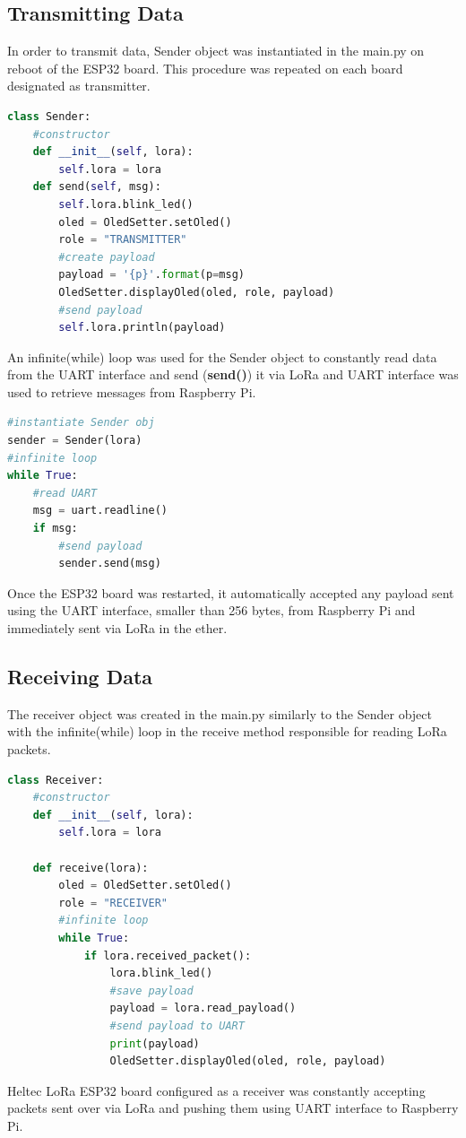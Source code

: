 \documentclass[oneside,12pt]{book}
\begin{document}
\subsection{Transmitting Data}
In order to transmit data, Sender object was instantiated in the main.py on reboot of the ESP32 board. This procedure was repeated on each board designated as transmitter.
\begin{lstlisting}[language=Python, caption=Class Sender - MicroPython,captionpos=b]
class Sender:
    #constructor
    def __init__(self, lora):
        self.lora = lora
    def send(self, msg):
        self.lora.blink_led()
        oled = OledSetter.setOled()
        role = "TRANSMITTER"
        #create payload
        payload = '{p}'.format(p=msg)
        OledSetter.displayOled(oled, role, payload)
        #send payload
        self.lora.println(payload)
\end{lstlisting}
An infinite(while) loop was used for the Sender object to constantly read data from the UART interface and send (\textbf{send()}) it via LoRa and UART interface was used to retrieve messages from Raspberry Pi.
\begin{lstlisting}[language=Python, caption=Instantiation of Sender obj - MicroPython,captionpos=b]
#instantiate Sender obj
sender = Sender(lora)
#infinite loop 
while True:
    #read UART
    msg = uart.readline()
    if msg:
        #send payload
        sender.send(msg)
\end{lstlisting}
Once the ESP32 board was restarted, it automatically accepted any payload sent using the UART interface, smaller than 256 bytes, from Raspberry Pi and immediately sent via LoRa in the ether.
\subsection{Receiving Data}
The receiver object was created in the main.py similarly to the Sender object with the infinite(while) loop in the receive method responsible for reading LoRa packets.
\begin{lstlisting}[language=Python, caption=Class Receiver - MicroPython]
class Receiver:
    #constructor
    def __init__(self, lora):
        self.lora = lora
    
    def receive(lora):
        oled = OledSetter.setOled()
        role = "RECEIVER"
        #infinite loop
        while True:
            if lora.received_packet():
                lora.blink_led()
                #save payload
                payload = lora.read_payload()
                #send payload to UART
                print(payload)
                OledSetter.displayOled(oled, role, payload)
\end{lstlisting}
Heltec LoRa ESP32 board configured as a receiver was constantly accepting packets sent over via LoRa and pushing them using UART interface to Raspberry Pi.
\end{document}
